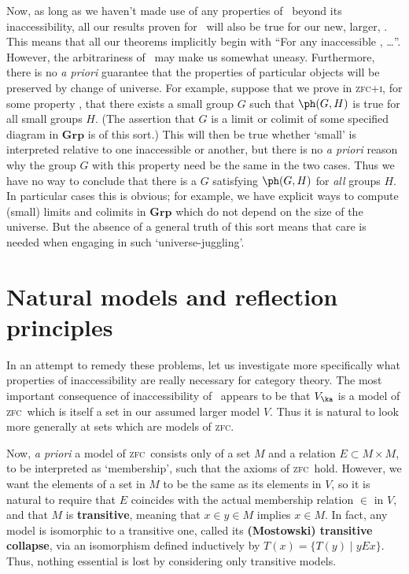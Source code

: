 \documentclass{amsart}
\def\zfc{\textsc{zfc}}
\def\zfci{\textsc{zfc+i}}
\begin{document}
Now, as long as we haven't made use of any properties of \ka\ beyond
its inaccessibility, all our results proven for \ka\ will also be true
for our new, larger, \ka.  This means that all our theorems implicitly
begin with ``For any inaccessible \ka, \dots''.  However, the
arbitrariness of \ka\ may make us somewhat uneasy.  Furthermore, there
is no \emph{a priori} guarantee that the properties of particular
objects will be preserved by change of universe.  For example, suppose
that we prove in \zfci, for some property \ph, that there exists a
small group $G$ such that $\ph(G,H)$ is true for all small groups $H$.
(The assertion that $G$ is a limit or colimit of some specified
diagram in $\mathbf{Grp}$ is of this sort.)  This will then be true
whether `small' is interpreted relative to one inaccessible or
another, but there is no \emph{a priori} reason why the group $G$ with
this property need be the same in the two cases.  Thus we have no way
to conclude that there is a $G$ satisfying $\ph(G,H)$ for \emph{all}
groups $H$.  In particular cases this is obvious; for example, we have
explicit ways to compute (small) limits and colimits in $\mathbf{Grp}$
which do not depend on the size of the universe.  But the absence of a
general truth of this sort means that care is needed when engaging in
such `universe-juggling'.


\section{Natural models and reflection principles}
\label{sec:nmod-refl}

In an attempt to remedy these problems, let us investigate more
specifically what properties of inaccessibility are really necessary
for category theory.  The most important consequence of
inaccessibility of \ka\ appears to be that $V_\ka$ is a model of \zfc\
which is itself a set in our assumed larger model $V$.  Thus it is
natural to look more generally at sets which are models of \zfc.

Now, \emph{a priori} a model of \zfc\ consists only of a set $M$ and a
relation $E\subset M\times M$, to be interpreted as `membership', such
that the axioms of \zfc\ hold.  However, we want the elements of a set
in $M$ to be the same as its elements in $V$, so it is natural to
require that $E$ coincides with the actual membership relation $\in$
in $V$, and that $M$ is \textbf{transitive}, meaning that $x\in y\in
M$ implies $x\in M$.  In fact, any model is isomorphic to a transitive
one, called its \textbf{(Mostowski) transitive collapse}, via an
isomorphism defined inductively by $T(x) = \{T(y) \mid yEx\}$.  Thus,
nothing essential is lost by considering only transitive models.
\end{document}
